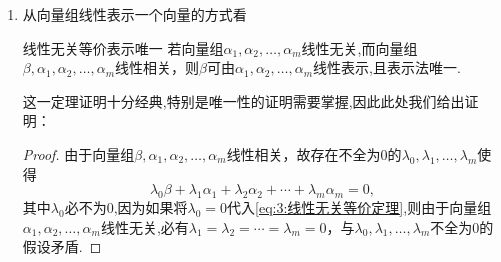 \begin{enumerate}
\begin{proof}
            \[
            \lambda_1 \alpha_{i_1} + \lambda_2 \alpha_{i_2} + \cdots + \lambda_k \alpha_{i_k} = 0,
            \]

            则将上式扩充为

            \[
                \lambda_1 \alpha_{i_1} + \lambda_2 \alpha_{i_2} + \cdots + \lambda_k \alpha_{i_k}  + 0 \alpha_{i_{k+1}} + \cdots + 0 \alpha_{i_n} = 0,
            \]

            其中 $\lambda_{k+1} = \lambda_{k+2} = \cdots = \lambda_n = 0$, 且 $\lambda_1,\lambda_2,\ldots,\lambda_k$ 不全为零，（即将不在子集中的其它元素以$0$作为系数加到方程中，这样就找到了一个满足线性相关定义的式子）这与 $\{ \alpha_1,\alpha_2,\ldots,\alpha_n \}$ 线性无关矛盾. 故 $\{ \alpha_{i_1},\alpha_{i_2},\ldots,\alpha_{i_k} \}$ 线性无关.

            相同的方法证明后者，设 $\{ \alpha_1,\alpha_2,\ldots,\alpha_n \}$ 线性相关，则存在不全为零的 $\lambda_1,\lambda_2,\ldots,\lambda_n$ 使得

            \[
            \lambda_1 \alpha_1 + \lambda_2 \alpha_2 + \cdots + \lambda_n \alpha_n = 0,
            \]

            则对于任意包含它的向量组,我们也可以将多出来的向量系数取$0$,这样就找到了一个满足线性相关定义的式子,因此包含它的向量组也线性相关.
          \end{proof}
          如果向量组的一个部分组线性相关，那么整个向量组也线性相关；

          如果向量组线性无关，那么它的任何一个部分组也线性无关.

    \item 从向量组线性表示一个向量的方式看
          \begin{theorem}{}{线性无关等价表示唯一}
              若向量组$\alpha_1,\alpha_2,\ldots,\alpha_m$线性无关,而向量组$\beta,\alpha_1,\alpha_2,\ldots,\alpha_m$线性相关，则$\beta$可由$\alpha_1,\alpha_2,\ldots,\alpha_m$线性表示,且表示法唯一.
          \end{theorem}
          这一定理证明十分经典,特别是唯一性的证明需要掌握,因此此处我们给出证明：

          \begin{proof}
              由于向量组$\beta,\alpha_1,\alpha_2,\ldots,\alpha_m$线性相关，故存在不全为0的$\lambda_0,\lambda_1,\ldots,\lambda_m$使得
              \begin{equation}\label{eq:3:线性无关等价定理}
                  \lambda_0\beta+\lambda_1\alpha_1+\lambda_2\alpha_2+\cdots+\lambda_m\alpha_m=0,
              \end{equation}
              其中$\lambda_0$必不为0,因为如果将$\lambda_0=0$代入\autoref{eq:3:线性无关等价定理},则由于向量组$\alpha_1,\alpha_2,\ldots,\alpha_m$线性无关,必有$\lambda_1=\lambda_2=\cdots=\lambda_m=0$，与$\lambda_0,\lambda_1,\ldots,\lambda_m$不全为0的假设矛盾.


\end{proof}
\end{enumerate}
